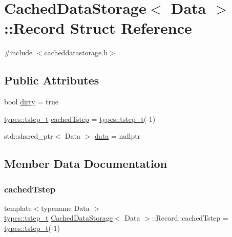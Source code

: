 \hypertarget{struct_cached_data_storage_1_1_record}{}\section{Cached\+Data\+Storage$<$ Data $>$\+::Record Struct Reference}
\label{struct_cached_data_storage_1_1_record}


{\ttfamily \#include $<$cacheddatastorage.\+h$>$}

\subsection*{Public Attributes}
\begin{DoxyCompactItemize}
\item 
bool \mbox{\hyperlink{struct_cached_data_storage_1_1_record_a514f4e4343610f1c1006d838c0aa6432}{dirty}} = true
\item 
\mbox{\hyperlink{namespacetypes_a9dc53a5ce11a196d82a6983030de8028}{types\+::tstep\+\_\+t}} \mbox{\hyperlink{struct_cached_data_storage_1_1_record_ae39c7ba62ccf9efbe71e72895392261f}{cached\+Tstep}} = \mbox{\hyperlink{namespacetypes_a9dc53a5ce11a196d82a6983030de8028}{types\+::tstep\+\_\+t}}(-\/1)
\item 
std\+::shared\+\_\+ptr$<$ Data $>$ \mbox{\hyperlink{struct_cached_data_storage_1_1_record_a4aeb7d0678c2435f346c6293204945fb}{data}} = nullptr
\end{DoxyCompactItemize}


\subsection{Member Data Documentation}
\mbox{\label{struct_cached_data_storage_1_1_record_ae39c7ba62ccf9efbe71e72895392261f}} 
\subsubsection{\texorpdfstring{cachedTstep}{cachedTstep}}
{\footnotesize\ttfamily template$<$typename Data $>$ \\
\mbox{\hyperlink{namespacetypes_a9dc53a5ce11a196d82a6983030de8028}{types\+::tstep\+\_\+t}} \mbox{\hyperlink{class_cached_data_storage}{Cached\+Data\+Storage}}$<$ Data $>$\+::Record\+::cached\+Tstep = \mbox{\hyperlink{namespacetypes_a9dc53a5ce11a196d82a6983030de8028}{types\+::tstep\+\_\+t}}(-\/1)}

